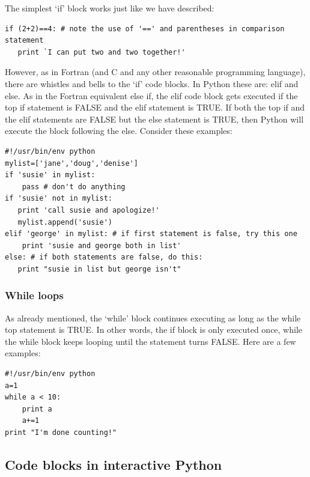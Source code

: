 \documentclass[11pt]{book}
\begin{document}
{The simplest `if' block works just like we have described:
{ \color{blue} \begin{verbatim}
if (2+2)==4: # note the use of '==' and parentheses in comparison statement
   print `I can put two and two together!'
\end{verbatim}}

However, as in Fortran (and C and any other reasonable programming language), there are whistles and bells to the `if' code blocks.  In Python these are:  {\color{blue}elif} and {\color{blue}else}.  
As in the Fortran equivalent {\color{blue}else if},  the {\color{blue}elif}  code block gets executed if the top {\color{blue}if} statement is FALSE and the  {\color{blue}elif}  statement is TRUE.  If both the top {\color{blue}if} and the {\color{blue}elif}  statements are FALSE but the  {\color{blue}else}  statement is TRUE, then Python will execute the block following the  {\color{blue}else}.  Consider these examples:

{ \color{blue} \begin{verbatim}
#!/usr/bin/env python
mylist=['jane','doug','denise']
if 'susie' in mylist:
    pass # don't do anything
if 'susie' not in mylist:
   print 'call susie and apologize!'
   mylist.append('susie')
elif 'george' in mylist: # if first statement is false, try this one
    print 'susie and george both in list' 
else: # if both statements are false, do this:
   print "susie in list but george isn't"
\end{verbatim}}

\subsubsection{While loops}

As already mentioned, the `while' block  continues executing as long as the {\color{blue}while}  top statement is TRUE.  In other words, the if block is only executed once, while the {\color{blue}while}  block keeps looping until the statement turns FALSE.    Here are a few examples:


{ \color{blue} \begin{verbatim}
#!/usr/bin/env python
a=1
while a < 10:
    print a
    a+=1
print "I'm done counting!"
\end{verbatim}}

\subsection{Code blocks in interactive Python}

}
\end{document}
